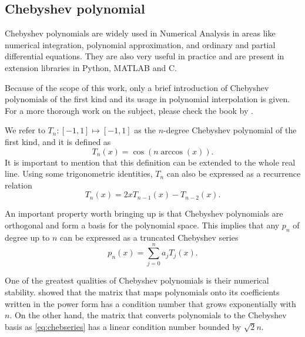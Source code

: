 \subsection{Chebyshev polynomial}

Chebyshev polynomials are widely used in Numerical Analysis in areas like numerical integration, polynomial approximation, and ordinary and partial differential equations.
They are also very useful in practice and are present in extension libraries in Python, MATLAB and C.

Because of the scope of this work, only a brief introduction of Chebyshev polynomials of the first kind and its usage in polynomial interpolation is given. For a more thorough work on the subject, please check the book by .

We refer to $T_n : [-1, 1] \mapsto [-1, 1]$ as the $n$-degree Chebyshev polynomial of the first kind, and it is defined as
\begin{equation}
T_n(x) = \cos({n\arccos (x)}).
\end{equation}
It is important to mention that this definition can be extended to the whole real line. Using some trigonometric identities, $T_n$ can also be expressed as a recurrence relation
\begin{equation}
T_n(x) = 2xT_{n-1}(x) - T_{n-2}(x).
\end{equation}

An important property worth bringing up is that Chebyshev polynomials are orthogonal and form a basis for the polynomial space. This implies that any $p_n$ of degree up to $n$ can be expressed as a truncated Chebyshev series
\begin{equation}\label{eq:chebseries}
p_n(x) = \sum_{j=0}^{n} a_j T_j(x).
\end{equation}

One of the greatest qualities of Chebyshev polynomials is their numerical stability.  showed that the matrix that maps polynomials onto its coefficients written in the power form has a condition number that grows exponentially with $n$. On the other hand, the matrix that converts polynomials to the Chebyshev basis as \autoref{eq:chebseries} has a linear condition number bounded by $\sqrt{2}n$.

